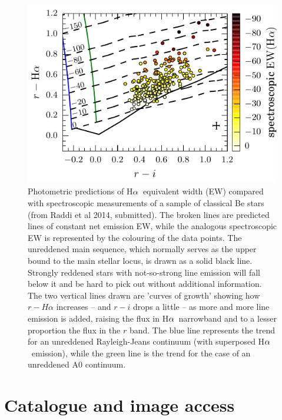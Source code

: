 \documentclass[a4paper,useAMS,usenatbib]{mn2e}
\def\ha{\mbox{H$\rm \alpha$}}
\begin{document}
{\begin{figure}
\begin{center}
  \includegraphics[width=\linewidth]{figures/raddi.pdf}
    \caption{Photometric predictions of \ha\ equivalent width (EW)
    compared with spectroscopic measurements
    of a sample of classical Be stars (from Raddi et al 2014, submitted).
    The broken lines are predicted lines
    of constant net emission EW,
    while the analogous spectroscopic EW is represented
    by the colouring of the data points.
    The unreddened main sequence, which normally serves 
    as the upper bound to the main stellar locus,
    is drawn as a solid black line.
    Strongly reddened stars with not-so-strong line emission
    will fall below it
    and be hard to pick out without additional information.
    The two vertical lines drawn are 'curves of growth'
    showing how $r - H\alpha$ increases 
    -- and $r - i$ drops a little --
    as more and more line emission is added,
    raising the flux in \ha\ narrowband
    and to a lesser proportion the flux in the $r$ band.
    The blue line represents the trend
    for an unreddened Rayleigh-Jeans continuum
    (with superposed \ha\ emission),
    while the green line is the trend
    for the case of an unreddened A0 continuum.}
    \label{fig:raddi}
\end{center}
\end{figure}

}

\section{Catalogue and image access}
\label{sec:dataaccess}
\end{document}
